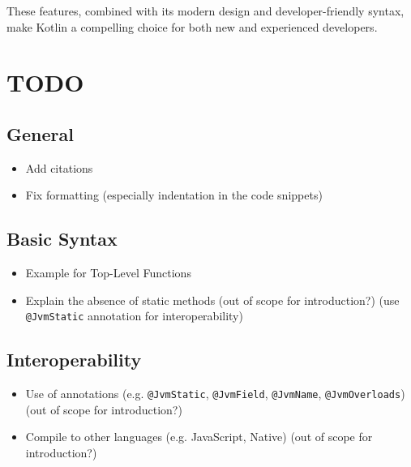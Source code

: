 \documentclass[a4paper, 11pt]{article}
\begin{document}
These features, combined with its modern design and developer-friendly syntax, make Kotlin a compelling choice for both new and experienced developers.

\newpage
\printbibliography[]












\newpage
\section{TODO}

  \subsection{General}
    \begin{itemize}
      \item Add citations
      \item Fix formatting (especially indentation in the code snippets)
    \end{itemize}
    
  \subsection{Basic Syntax}
    \begin{itemize}
      \item Example for Top-Level Functions
      \item Explain the absence of static methods (out of scope for introduction?) (use \texttt{@JvmStatic} annotation for interoperability)
    \end{itemize}

  \subsection{Interoperability}
    \begin{itemize}
      \item Use of annotations (e.g. \texttt{@JvmStatic}, \texttt{@JvmField}, \texttt{@JvmName}, \texttt{@JvmOverloads}) (out of scope for introduction?)
      \item Compile to other languages (e.g. JavaScript, Native) (out of scope for introduction?)
    \end{itemize}
\end{document}
